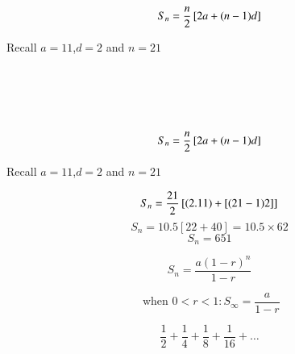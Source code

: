 \documentclass[12pt]{article}
\begin{document}



\[ S_n  = {n \over 2} \left[ 2a+(n-1)d \right] \]

Recall $a=11$,$d=2$ and $n=21$


\[ \phantom{S_n  = {21 \over 2} \left[ (2.11) +[(21-1)2] \right]} \]
\[ \phantom{S_n  = 10.5 \left[ 22 + 40 \right]  = 10.5 \times 62}\]
\[ \phantom{S_n  = 651} \] 




\[ S_n  = {n \over 2} \left[ 2a+(n-1)d \right] \]

Recall $a=11$,$d=2$ and $n=21$


\[ S_n  = {21 \over 2} \left[ (2.11) +[(21-1)2] \right] \]
\[ S_n  = 10.5 \left[ 22 + 40 \right]  = 10.5 \times 62\]
\[ S_n  = 651 \] 



{

\[ S_n = \frac{a(1-r)^n}{1-r} \]
}
{

\[ \mbox{ when } 0 < r < 1 : S_{\infty} = \frac{a}{1-r} \]
}



\[ \frac{1}{2} + \frac{1}{4} + \frac{1}{8} +  \frac{1}{16} +\ldots  \]
\end{document}

